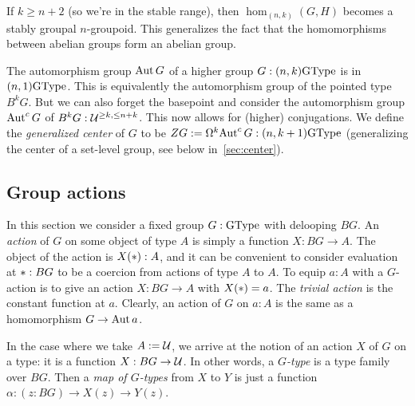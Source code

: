 If $k\ge n+2$ (so we're in the stable range), then $\hom_{(n,k)}(G,H)$
becomes a stably groupal $n$-groupoid. This generalizes the
fact that the homomorphisms between abelian groups form an abelian
group.

The automorphism group $\operatorname{Aut} G$ of a higher group $G:(n,k)\mathrm{GType}$ is in
$(n,1)\mathrm{GType}$.
This is equivalently the automorphism group of the pointed type $B^kG$.
But we can also forget the basepoint and consider the
automorphism group $\operatorname{Aut}^c G$ of $B^kG:\mathcal{U}^{\ge k,\le n+k}$. This
now allows for (higher) conjugations. We define the \emph{generalized
  center} of $G$ to be $ZG := \Omega^k\!\operatorname{Aut}^c G : (n,k+1)\mathrm{GType}$
(generalizing the center of a set-level group,
see below in~\autoref{sec:center}).

\subsection{Group actions}
\label{sec:actions}

In this section we consider a fixed group $G : \mathrm{GType}$ with delooping
$BG$. An \emph{action} of $G$ on some object of type $A$ is simply
a function $X : BG \to A$. The object of the action is $X(\ast) : A$,
and it can be convenient to consider evaluation at $\ast : BG$ to be a
coercion from actions of type $A$ to $A$. To equip $a : A$ with a
$G$-action is to give an action $X : BG \to A$ with $X(\ast)=a$. The
\emph{trivial action} is the constant function at $a$. Clearly, an
action of $G$ on $a:A$ is the same as a homomorphism $G \to \operatorname{Aut} a$.

In the case where we take $A:=\mathcal{U}$, we arrive at the notion of an action $X$ of $G$ on a type:
it is a function $X:BG\to\mathcal{U}$. 
In other words, a \emph{$G$-type} is a type family over $BG$.
Then a \emph{map of $G$-types} from $X$ to $Y$ is just a function $\alpha :
(z : BG) \to X(z) \to Y(z)$.

